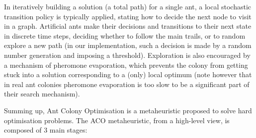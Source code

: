 In iteratively building a solution (a total path) for a single ant, a  local  stochastic  transition  policy  is typically applied, stating how to decide the next node to visit in a graph. Artificial  ants  make  their  decisions  and  transitions  to  their  next  state  in  discrete  time steps, deciding whether to follow the main trails, or to random explore a new path (in our implementation, such a decision is made by a random number generation and imposing a threshold).
Exploration  is  also encouraged  by  a mechanism of  pheromone  evaporation, which prevents the  colony from  getting  stuck  into a solution  corresponding to a (only) local optimum (note however that in  real  ant  colonies  pheromone evaporation is too slow to be a significant part of their search mechanism).

Summing up, Ant Colony Optimisation is a metaheuristic proposed to solve hard optimisation problems. 
The ACO metaheuristic, from a high-level view, is composed of 3 main    stages:    
